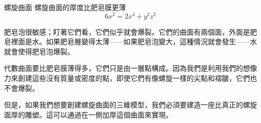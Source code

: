 \begin{surferPage}{螺旋曲面}
螺旋曲面的厚度比肥皂膜更薄\\
  \smallskip
\[6x^2	= 2x^4	+ y^2	z^2\]

\singlespacing

肥皂泡很敏感；盯著它們看，它們似乎就會爆裂。它們的曲面有兩個面，外面是肥皂裡面是水。如果肥皂層變得太薄——如果肥皂泡變大，這種情況就會發生——水就會使得肥皂泡爆裂。\\

\vspace{0,3cm}

代數曲面要比肥皂膜薄得多，它們只是由一層點構成。因為我們是利用我們的想像力來創建這些沒有質量或密度的點，即使它們有像螺旋一樣的尖點和褶皺，它們也不會爆裂。\\

\vspace{0,3cm}

但是，如果我們想要創建螺旋曲面的三維模型，我們必須要建造一座比真正的螺旋面厚的雕塑。這可以通過在一側加厚這個曲面來實現。
\end{surferPage}
